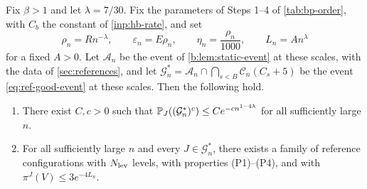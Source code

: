 \begin{lemma}\label{lem:bp-strong-event}
Fix $\beta>1$ and let $\lambda=7/30$. Fix the parameters of Steps 1--4 of \cref{tab:bp-order}, with $C_b$ the constant of \cref{inp:hb-rate}, and set
\[
 \rho_n=Rn^{-\lambda},\qquad\varepsilon_n=E\rho_n,\qquad\eta_n=\frac{\rho_n}{1000},\qquad L_n=An^\lambda
\]
for a fixed $A>0$. Let $\mathcal A_n$ be the event of \cref{b:lem:static-event} at these scales, with the data of \cref{sec:references}, and let $\mathcal G_n^*=\mathcal A_n\cap\bigcap_{s<B}\mathcal C_n(C_s+5)$ be the event \eqref{eq:ref-good-event} at these scales. Then the following hold.
\begin{enumerate}[label=\textup{(\roman*)}]
\item There exist $C,c>0$ such that $\mathbb P_J((\mathcal G_n^*)^c)\le Ce^{-cn^{1-4\lambda}}$ for all sufficiently large $n$.
\item For all sufficiently large $n$ and every $J\in\mathcal G_n^*$, there exists a family of reference configurations with $N_{\rm lev}$ levels, with properties (P1)--(P4), and with $\pi^J(V)\le3e^{-4L_n}$.
\end{enumerate}
\end{lemma}

